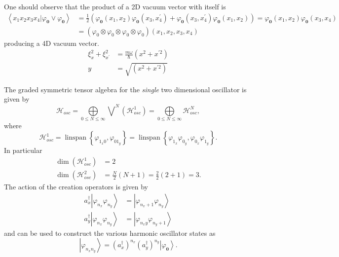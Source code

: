 \documentclass[aps,preprint]{revtex4}%
\begin{document}
One should observe that the product of a 2D vacuum vector with itself is
\begin{align}
\left\langle \left.  x_{1}x_{2}x_{3}x_{4}\right\vert \varphi_{\mathbf{0}}%
\vee\varphi_{\mathbf{0}}\right\rangle  & =\frac{1}{2}\left(  \varphi
_{\mathbf{0}}\left(  x_{1},x_{2}\right)  \varphi_{\mathbf{0}}\left(
x_{3},x_{4}^{\prime}\right)  +\varphi_{\mathbf{0}}\left(  x_{3},x_{4}^{\prime
}\right)  \varphi_{\mathbf{0}}\left(  x_{1},x_{2}\right)  \right)
=\varphi_{\mathbf{0}}\left(  x_{1},x_{2}\right)  \varphi_{\mathbf{0}}\left(
x_{3},x_{4}\right)  \\
& =\left(  \varphi_{0}\otimes\varphi_{0}\otimes\varphi_{0}\otimes\varphi
_{0}\right)  \left(  x_{1},x_{2},x_{3},x_{4}\right)
\end{align}
producing a 4D vacuum vector.
\begin{align}
\xi_{x}^{2}+\xi_{x^{\prime}}^{2} &  =\frac{m\omega}{\hbar}\left(
x^{2}+x^{\prime2}\right)  \\
y &  =\sqrt{\left(  x^{2}+x^{\prime2}\right)  }%
\end{align}


The graded symmetric tensor algebra for the \emph{single }two dimensional
oscillator is given by
\begin{equation}
\mathcal{H}_{osc}=\bigoplus\limits_{0\leq N\leq\infty}\bigvee\nolimits^{N}%
\left(  \mathcal{H}_{osc}^{1}\right)  =\bigoplus\limits_{0\leq N\leq\infty
}\mathcal{H}_{osc}^{N},
\end{equation}
where%
\begin{equation}
\mathcal{H}_{osc}^{1}=\operatorname*{linspan}\left\{  \varphi_{1_{x}0}%
,\varphi_{01_{y}}\right\}  =\operatorname*{linspan}\left\{  \varphi_{1_{x}%
}\varphi_{0_{y}},\varphi_{0_{x}}\varphi_{1_{y}}\right\}  .
\end{equation}
In particular
\begin{align}
\dim\left(  \mathcal{H}_{osc}^{1}\right)   &  =2\\
\dim\left(  \mathcal{H}_{osc}^{2}\right)   &  =\frac{N}{2}\left(  N+1\right)
=\frac{2}{2}\left(  2+1\right)  =3.
\end{align}
The action of the creation operators is given by
\begin{align}
a_{x}^{\dagger}\left\vert \varphi_{n_{x}}\varphi_{n_{y}}\right\rangle  &
=\left\vert \varphi_{n_{x}+1}\varphi_{n_{y}}\right\rangle \\
a_{y}^{\dagger}\left\vert \varphi_{n_{x}}\varphi_{n_{y}}\right\rangle  &
=\left\vert \varphi_{n_{x}y}\varphi_{n_{y}+1}\right\rangle
\end{align}
and can be used to construct the various harmonic oscillator states as
\begin{equation}
\left\vert \varphi_{n_{x}n_{y}}\right\rangle =\left(  a_{x}^{\dagger}\right)
^{n_{x}}\left(  a_{y}^{\dagger}\right)  ^{n_{y}}\left\vert \varphi
_{\mathbf{0}}\right\rangle .
\end{equation}
\end{document}
